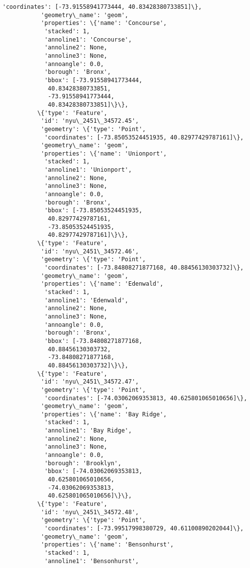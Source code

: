 \documentclass[11pt]{article}
\begin{document}
\begin{Verbatim}[commandchars=\\\{\}]
            'coordinates': [-73.91558941773444, 40.83428380733851]\},
           'geometry\_name': 'geom',
           'properties': \{'name': 'Concourse',
            'stacked': 1,
            'annoline1': 'Concourse',
            'annoline2': None,
            'annoline3': None,
            'annoangle': 0.0,
            'borough': 'Bronx',
            'bbox': [-73.91558941773444,
             40.83428380733851,
             -73.91558941773444,
             40.83428380733851]\}\},
          \{'type': 'Feature',
           'id': 'nyu\_2451\_34572.45',
           'geometry': \{'type': 'Point',
            'coordinates': [-73.85053524451935, 40.82977429787161]\},
           'geometry\_name': 'geom',
           'properties': \{'name': 'Unionport',
            'stacked': 1,
            'annoline1': 'Unionport',
            'annoline2': None,
            'annoline3': None,
            'annoangle': 0.0,
            'borough': 'Bronx',
            'bbox': [-73.85053524451935,
             40.82977429787161,
             -73.85053524451935,
             40.82977429787161]\}\},
          \{'type': 'Feature',
           'id': 'nyu\_2451\_34572.46',
           'geometry': \{'type': 'Point',
            'coordinates': [-73.84808271877168, 40.88456130303732]\},
           'geometry\_name': 'geom',
           'properties': \{'name': 'Edenwald',
            'stacked': 1,
            'annoline1': 'Edenwald',
            'annoline2': None,
            'annoline3': None,
            'annoangle': 0.0,
            'borough': 'Bronx',
            'bbox': [-73.84808271877168,
             40.88456130303732,
             -73.84808271877168,
             40.88456130303732]\}\},
          \{'type': 'Feature',
           'id': 'nyu\_2451\_34572.47',
           'geometry': \{'type': 'Point',
            'coordinates': [-74.03062069353813, 40.625801065010656]\},
           'geometry\_name': 'geom',
           'properties': \{'name': 'Bay Ridge',
            'stacked': 1,
            'annoline1': 'Bay Ridge',
            'annoline2': None,
            'annoline3': None,
            'annoangle': 0.0,
            'borough': 'Brooklyn',
            'bbox': [-74.03062069353813,
             40.625801065010656,
             -74.03062069353813,
             40.625801065010656]\}\},
          \{'type': 'Feature',
           'id': 'nyu\_2451\_34572.48',
           'geometry': \{'type': 'Point',
            'coordinates': [-73.99517998380729, 40.61100890202044]\},
           'geometry\_name': 'geom',
           'properties': \{'name': 'Bensonhurst',
            'stacked': 1,
            'annoline1': 'Bensonhurst',

\end{Verbatim}
\end{document}
